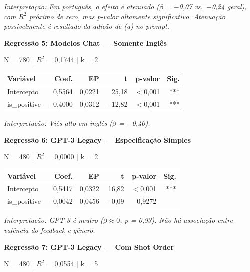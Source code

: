 \documentclass[12pt,a4paper]{article}
\begin{document}
\noindent\textit{Interpretação: Em português, o efeito é atenuado ($\beta$ = $-$0,07 vs.\ $-$0,24
geral), com $R^2$ próximo de zero, mas p-valor altamente significativo.
Atenuação possivelmente é resultado da adição de (a) no prompt.}

\vspace{0.5cm}
\noindent\textbf{Regressão 5: Modelos Chat --- Somente Inglês}

\noindent N = 780 $|$ $R^2$ = 0,1744 $|$ k = 2

\begin{table}[H]
\centering
\begin{tabular}{lrrrrr}
\toprule
\textbf{Variável} & \textbf{Coef.} & \textbf{EP} & \textbf{t} & \textbf{p-valor} & \textbf{Sig.} \\
\midrule
Intercepto & 0,5564 & 0,0221 & 25,18 & $<$0,001 & *** \\
is\_positive & $-$0,4000 & 0,0312 & $-$12,82 & $<$0,001 & *** \\
\bottomrule
\end{tabular}
\end{table}

\noindent\textit{Interpretação: Viés alto em inglês ($\beta$ = $-$0,40).}

\vspace{0.5cm}
\noindent\textbf{Regressão 6: GPT-3 Legacy --- Especificação Simples}

\noindent N = 480 $|$ $R^2$ = 0,0000 $|$ k = 2

\begin{table}[H]
\centering
\begin{tabular}{lrrrrr}
\toprule
\textbf{Variável} & \textbf{Coef.} & \textbf{EP} & \textbf{t} & \textbf{p-valor} & \textbf{Sig.} \\
\midrule
Intercepto & 0,5417 & 0,0322 & 16,82 & $<$0,001 & *** \\
is\_positive & $-$0,0042 & 0,0456 & $-$0,09 & 0,9272 & \\
\bottomrule
\end{tabular}
\end{table}

\noindent\textit{Interpretação: GPT-3 é neutro ($\beta \approx 0$, p = 0,93). Não há associação
entre valência do feedback e gênero.}

\vspace{0.5cm}
\noindent\textbf{Regressão 7: GPT-3 Legacy --- Com Shot Order}

\noindent N = 480 $|$ $R^2$ = 0,0554 $|$ k = 5
\end{document}
